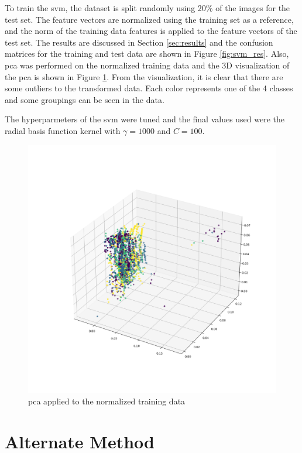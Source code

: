 \documentclass[10pt,twocolumn,letterpaper]{article}
\begin{document}
To train the \acrshort{svm}, the dataset is split randomly using 20\% of the images for the test set. The feature vectors are normalized using the training set as a reference, and the norm of the training data features is applied to the feature vectors of the test set. The results are discussed in Section \ref{sec:results} and the confusion matrices for the training and test data are shown in Figure \ref{fig:svm_res}. Also, \acrfull{pca} was performed on the normalized training data and the 3D visualization of the \acrshort{pca} is shown in Figure \ref{fig:pca}. From the visualization, it is clear that there are some outliers to the transformed data. Each color represents one of the 4 classes and some groupings can be seen in the data.

The hyperparmeters of the \acrshort{svm} were tuned and the final values used were the radial basis function kernel with $\gamma = 1000$ and $C = 100$.

\begin{figure}[H]
  \centering
   \includegraphics[width=0.9\linewidth, trim={14em, 12em, 9em, 15em}, clip]{pca}
   \caption{\acrshort{pca} applied to the normalized training data}
   \label{fig:pca}
\end{figure}

\section{Alternate Method}
\label{sec:alt_method}
\end{document}
